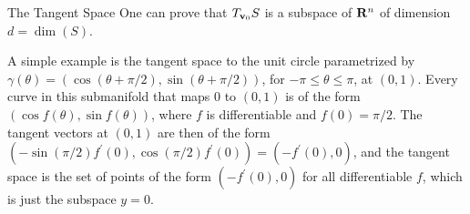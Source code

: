 \begin{section}{The Tangent Space}
One can prove that $T_{\mathbf{v}_0}S$ is a subspace of $\mathbf{R}^n$ of dimension $d = \dim(S)$.

A simple example is the tangent space to the unit circle parametrized by $\gamma(\theta) = (\cos(\theta + \pi/2), \sin(\theta + \pi/2))$, for $-\pi \le \theta \le \pi$, at $(0,1)$.  Every curve in this submanifold that maps $0$ to $(0,1)$ is of the form $(\cos f(\theta),\sin f(\theta))$, where $f$ is differentiable and $f(0) = \pi/2$.  The tangent vectors at $(0,1)$ are then of the form $(-\sin(\pi/2)f^\prime(0), \cos(\pi/2)f^\prime(0)) = (-f^\prime(0),0)$, and the tangent space is the set of points of the form $(-f^\prime(0), 0)$ for all differentiable $f$, which is just the subspace $y = 0$.

\end{section}

